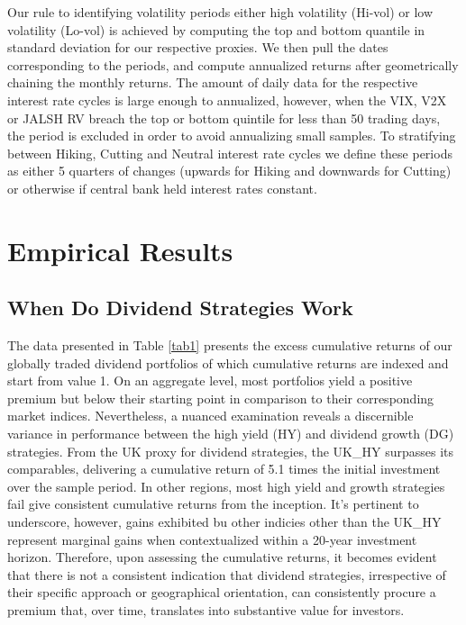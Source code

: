 \documentclass[12pt,preprint, authoryear]{elsarticle}
\numberwithin{equation}{section}
\numberwithin{figure}{section}
\numberwithin{table}{section}
\begin{document}
Our rule to identifying volatility periods either high volatility
(Hi-vol) or low volatility (Lo-vol) is achieved by computing the top and
bottom quantile in standard deviation for our respective proxies. We
then pull the dates corresponding to the periods, and compute annualized
returns after geometrically chaining the monthly returns. The amount of
daily data for the respective interest rate cycles is large enough to
annualized, however, when the VIX, V2X or JALSH RV breach the top or
bottom quintile for less than 50 trading days, the period is excluded in
order to avoid annualizing small samples. To stratifying between Hiking,
Cutting and Neutral interest rate cycles we define these periods as
either 5 quarters of changes (upwards for Hiking and downwards for
Cutting) or otherwise if central bank held interest rates constant.

\newpage

\hypertarget{empirical-results}{%
\section{Empirical Results}\label{empirical-results}}

\hypertarget{when-do-dividend-strategies-work}{%
\subsection{When Do Dividend Strategies
Work}\label{when-do-dividend-strategies-work}}

The data presented in Table \ref{tab1} presents the excess cumulative
returns of our globally traded dividend portfolios of which cumulative
returns are indexed and start from value 1. On an aggregate level, most
portfolios yield a positive premium but below their starting point in
comparison to their corresponding market indices. Nevertheless, a
nuanced examination reveals a discernible variance in performance
between the high yield (HY) and dividend growth (DG) strategies. From
the UK proxy for dividend strategies, the UK\_HY surpasses its
comparables, delivering a cumulative return of 5.1 times the initial
investment over the sample period. In other regions, most high yield and
growth strategies fail give consistent cumulative returns from the
inception. It's pertinent to underscore, however, gains exhibited bu
other indicies other than the UK\_HY represent marginal gains when
contextualized within a 20-year investment horizon. Therefore, upon
assessing the cumulative returns, it becomes evident that there is not a
consistent indication that dividend strategies, irrespective of their
specific approach or geographical orientation, can consistently procure
a premium that, over time, translates into substantive value for
investors.
\end{document}
